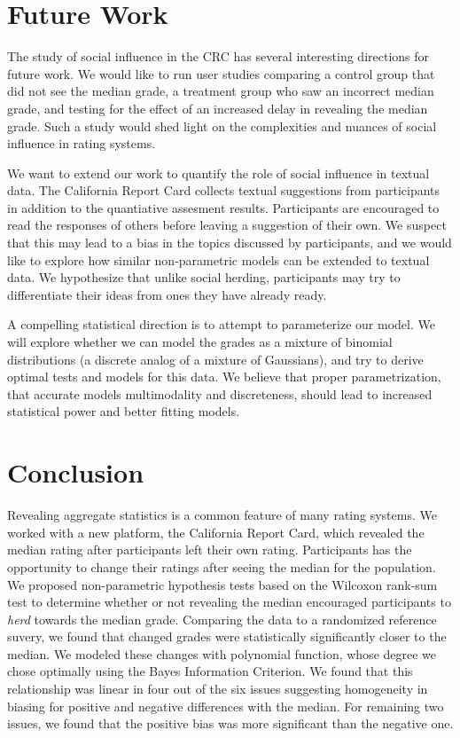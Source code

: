 \section{Future Work}
The study of social influence in the CRC has several interesting directions for future work.
We would like to run user studies comparing a control group that did not see the median grade, 
a treatment group who saw an incorrect median grade, and testing for the effect of an increased delay in revealing the median grade.
Such a study would shed light on the complexities and nuances of social influence in rating systems.
 
We want to extend our work to quantify the role of social influence in textual data. 
The California Report Card collects textual suggestions from participants in addition to the quantiative assesment results. 
Participants are encouraged to read the responses of others before leaving a suggestion of their own.
We suspect that this may lead to a bias in the topics discussed by participants, and we would like to explore how similar non-parametric models can be extended to textual data.
We hypothesize that unlike social herding, participants may try to differentiate their ideas from ones they have already ready.

A compelling statistical direction is to attempt to parameterize our model.
We will explore whether we can model the grades as a mixture of binomial distributions (a discrete analog of a mixture of Gaussians), and try to derive optimal tests and models for this data.
We believe that proper parametrization, that accurate models multimodality and discreteness, should lead to increased statistical power and better fitting models.

\section{Conclusion}
Revealing aggregate statistics is a common feature of many rating systems.
We worked with a new platform, the California Report Card, which revealed the median rating after participants left their own rating.
Participants has the opportunity to change their ratings after seeing the median for the population.
We proposed non-parametric hypothesis tests based on the Wilcoxon rank-sum test to determine whether or not revealing the median encouraged participants to \emph{herd} towards the median grade.
Comparing the data to a randomized reference suvery, we found that changed grades were statistically significantly closer to the median.
We modeled these changes with polynomial function, whose degree we chose optimally using the Bayes Information Criterion. 
We found that this relationship was linear in four out of the six issues suggesting homogeneity in biasing for positive and negative differences with the median.
For remaining two issues, we found that the positive bias was more significant than the negative one.

